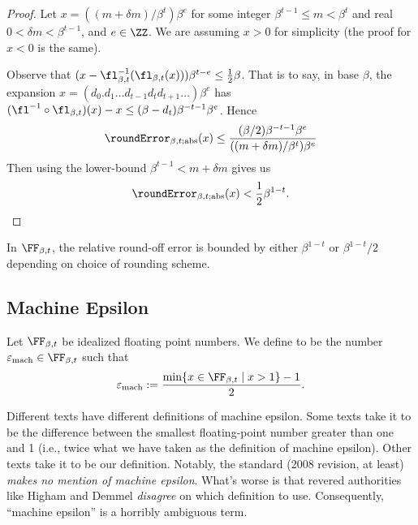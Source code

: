 \begin{proof}
Let $x=((m+\delta m)/\beta^{t})\beta^{e}$ for some integer $\beta^{t-1}\leq m<\beta^{t}$
and real $0<\delta m<\beta^{t-1}$, and $e\in\ZZ$. We are assuming $x>0$
for simplicity (the proof for $x<0$ is the same). 

Observe that $(x - \fl^{-1}_{\beta,t}(\fl_{\beta,t}(x)))\beta^{t-e}\leq \frac{1}{2}\beta$.
That is to say, in base $\beta$, the expansion $x = (d_{0}.d_{1}\dots d_{t-1}d_{t}d_{t+1}\dots)\beta^{e}$
has $(\fl^{-1}\circ\fl_{\beta,t})(x) - x\leq (\beta -d_{t})\beta^{-t-1}\beta^{e}$. Hence
\begin{equation}
  \roundError_{\beta,t;\text{abs}}(x)\leq
  \frac{(\beta/2)\beta^{-t-1}\beta^{e}}{((m+\delta m)/\beta^{t})\beta^{e}}
\end{equation}
Then using the lower-bound $\beta^{t-1}< m+\delta m$ gives us
\begin{equation*}
  \roundError_{\beta,t;\text{abs}}(x) < \frac{1}{2}\beta^{1-t}.\qedhere
\end{equation*}
\end{proof}


\begin{thm}
  In $\FF_{\beta,t}$, the relative round-off error is bounded by either
  $\beta^{1-t}$ or $\beta^{1-t}/2$ depending on choice of rounding scheme.
\end{thm}

\subsection{Machine Epsilon}

\begin{defn}\label{defn:idealized:machine-epsilon}
Let $\FF_{\beta,t}$ be idealized floating point numbers. We define
 to be the number
$\varepsilon_{\text{mach}}\in\FF_{\beta,t}$ such that
\begin{equation}
\varepsilon_{\text{mach}} := \frac{\min\{x\in\FF_{\beta,t}\mid x>1\}-1}{2}.
\end{equation}
\end{defn}

\begin{ddanger}
  Different texts have different definitions of machine epsilon. Some
  texts take it to be the difference between the smallest floating-point
  number greater than one and 1 (i.e., twice what we have taken as the
  definition of machine epsilon). Other texts take it to be our
  definition. Notably, the  standard (2008 revision, at least)
  \emph{makes no mention of machine epsilon}. What's worse is that 
  revered authorities like Higham and Demmel \emph{disagree} on which
  definition to use. Consequently, ``machine epsilon'' is a horribly
  ambiguous term.
\end{ddanger}

